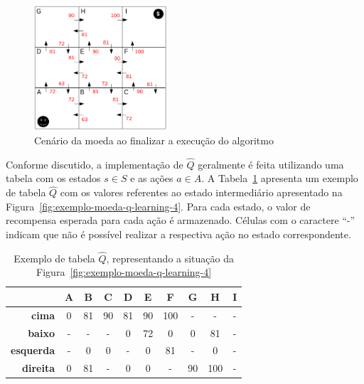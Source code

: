 \begin{figure}[h]
	\centering
	\includegraphics[width=0.44\textwidth]{img/exemplo-moeda-q-learning-5}
	\caption{Cenário da moeda ao finalizar a execução do algoritmo}
	\label{fig:exemplo-moeda-q-learning-5}
\end{figure}

Conforme discutido, a implementação de $\widehat{Q}$ geralmente é feita utilizando uma tabela com os estados $s \in S$ e as ações $a \in A$. A Tabela~\ref{tab:exemplo-moeda-q-learning} apresenta um exemplo de tabela $\widehat{Q}$ com os valores referentes ao estado intermediário apresentado na Figura~\ref{fig:exemplo-moeda-q-learning-4}. Para cada estado, o valor de recompensa esperada para cada ação é armazenado. Células com o caractere ``-'' indicam que não é possível realizar a respectiva ação no estado correspondente.

\begin{table}[h]
	\centering
	\begin{tabular}{r|ccccccccc}
		\multicolumn{1}{l|}{} & \textbf{A} & \textbf{B} & \textbf{C} & \textbf{D} & \textbf{E} & \textbf{F} & \textbf{G} & \textbf{H} & \textbf{I} \\ \hline
		\textbf{cima}         & 0          & 81         & 90         & 81         & 90         & 100        & -          & -          & -          \\
		\textbf{baixo}        & -          & -          & -          & 0          & 72         & 0          & 0          & 81         & -          \\
		\textbf{esquerda}     & -          & 0          & 0          & -          & 0          & 81         & -          & 0          & -          \\
		\textbf{direita}      & 0          & 81         & -          & 0          & 0          & -          & 90         & 100        & -         
	\end{tabular}
	\caption{Exemplo de tabela $\widehat{Q}$, representando a situação da Figura~\ref{fig:exemplo-moeda-q-learning-4}}
	\label{tab:exemplo-moeda-q-learning}
\end{table}

